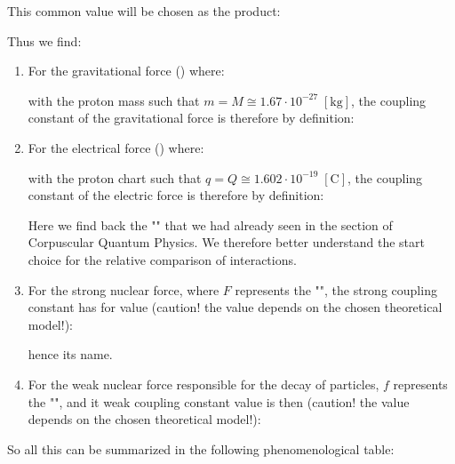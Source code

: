 	This common value will be chosen as the product:
	
	Thus we find:
	\begin{enumerate}
		\item For the gravitational force () where:
		
		with the proton mass such that $m=M\cong 1.67\cdot 10^{-27}\; [\text{kg}]$, the coupling constant of the gravitational force is therefore by definition:
		
		\item For the electrical force () where:
		
		with the proton chart such that $q=Q\cong 1.602\cdot 10^{-19}\; [\text{C}]$, the coupling constant of the electric force is therefore by definition:
		
		\begin{tcolorbox}[title=Remark,colframe=black,arc=10pt]
		Here we find back the "" that we had already seen in the section of Corpuscular Quantum Physics. We therefore better understand the start choice for the relative comparison of interactions.
		\end{tcolorbox}
		\item For the strong nuclear force, where $F$ represents the "", the strong coupling constant has for value (caution! the value depends on the chosen theoretical model!):
		
		hence its name.
		\item For the weak nuclear force responsible for the decay of particles, $f$ represents the "", and it weak coupling constant value is then (caution! the value depends on the chosen theoretical model!):
		
	\end{enumerate}
	 So all this can be summarized in the following phenomenological table: 
